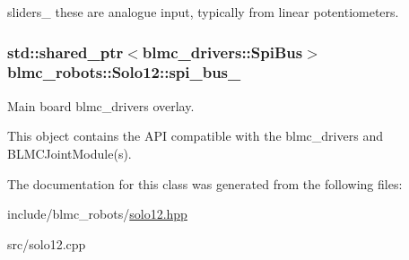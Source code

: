 sliders\+\_\+ these are analogue input, typically from linear potentiometers. 

\subsubsection[{\texorpdfstring{spi\+\_\+bus\+\_\+}{spi_bus_}}]{\setlength{\rightskip}{0pt plus 5cm}std\+::shared\+\_\+ptr$<$blmc\+\_\+drivers\+::\+Spi\+Bus$>$ blmc\+\_\+robots\+::\+Solo12\+::spi\+\_\+bus\+\_\+\hspace{0.3cm}{\ttfamily [private]}}\hypertarget{classblmc__robots_1_1Solo12_a416708664f404b0d140e02fe8b90bd00}{}\label{classblmc__robots_1_1Solo12_a416708664f404b0d140e02fe8b90bd00}


Main board blmc\+\_\+drivers overlay. 

This object contains the A\+PI compatible with the blmc\+\_\+drivers and B\+L\+M\+C\+Joint\+Module(s). 

The documentation for this class was generated from the following files\+:\begin{DoxyCompactItemize}
\item 
include/blmc\+\_\+robots/\hyperlink{solo12_8hpp}{solo12.\+hpp}\item 
src/solo12.\+cpp\end{DoxyCompactItemize}
